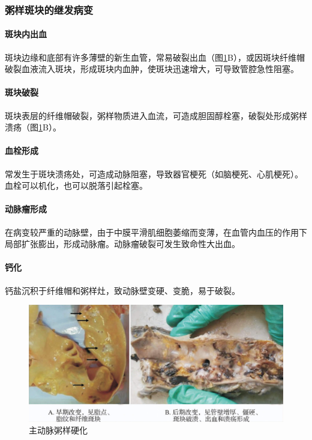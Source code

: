 \subsubsection{粥样斑块的继发病变}

\paragraph{斑块内出血}
斑块边缘和底部有许多薄壁的新生血管，常易破裂出血（图\ref{fig6-2}B），或因斑块纤维帽破裂血液流入斑块，形成斑块内血肿，使斑块迅速增大，可导致管腔急性阻塞。

\paragraph{斑块破裂}
斑块表层的纤维帽破裂，粥样物质进入血流，可造成胆固醇栓塞，破裂处形成粥样溃疡（图\ref{fig6-2}B）。

\paragraph{血栓形成}
常发生于斑块溃疡处，可造成动脉阻塞，导致器官梗死（如脑梗死、心肌梗死）。血栓可以机化，也可以脱落引起栓塞。

\paragraph{动脉瘤形成}
在病变较严重的动脉壁，由于中膜平滑肌细胞萎缩而变薄，在血管内血压的作用下局部扩张膨出，形成动脉瘤。动脉瘤破裂可发生致命性大出血。

\paragraph{钙化}
钙盐沉积于纤维帽和粥样灶，致动脉壁变硬、变脆，易于破裂。

\begin{figure}[!htbp]
    \centering
    \includegraphics{./images/Image00094.jpg}
    \captionsetup{justification=centering}
    \caption{主动脉粥样硬化}
    \label{fig6-2}
\end{figure}


